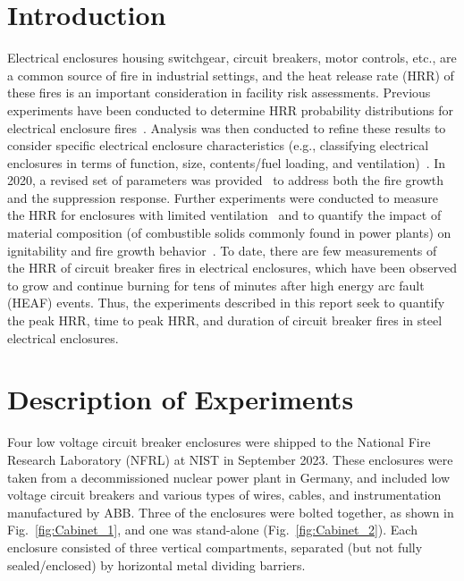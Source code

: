 \documentclass[12pt]{article}
\begin{document}
\pagebreak


\section{Introduction}

Electrical enclosures housing switchgear, circuit breakers, motor controls, etc., are a common source of fire in industrial settings, and the heat release rate (HRR) of these fires is an important consideration in facility risk assessments. Previous experiments have been conducted to determine HRR probability distributions for electrical enclosure fires~\cite{NUREG/CR-7197}. Analysis was then conducted to refine these results to consider specific electrical enclosure characteristics (e.g., classifying electrical enclosures in terms of function, size, contents/fuel loading, and ventilation)~\cite{NUREG-2178}. 
In 2020, a revised set of parameters was provided~\cite{NUREG2230} to address both the fire growth and the suppression response. Further experiments were conducted to measure the HRR for enclosures with limited ventilation~\cite{OLIVE-FIRE} and to quantify the impact of material composition (of combustible solids commonly found in power plants) on ignitability and fire growth behavior~\cite{leventon2024nist}. To date, there are few measurements of the HRR of circuit breaker fires in electrical enclosures, which have been observed to grow and continue burning for tens of minutes after high energy arc fault (HEAF) events. Thus, the experiments described in this report seek to quantify the peak HRR, time to peak HRR, and duration of circuit breaker fires in steel electrical enclosures.


\section{Description of Experiments}

Four low voltage circuit breaker enclosures were shipped to the National Fire Research Laboratory (NFRL) at NIST in September 2023. These enclosures were taken from a decommissioned nuclear power plant in Germany, and included low voltage circuit breakers and various types of wires, cables, and instrumentation manufactured by ABB. Three of the enclosures were bolted together, as shown in Fig.~\ref{fig:Cabinet_1}, and one was stand-alone (Fig.~\ref{fig:Cabinet_2}). Each enclosure consisted of three vertical compartments, separated (but not fully sealed/enclosed) by horizontal metal dividing barriers. 
\end{document}
